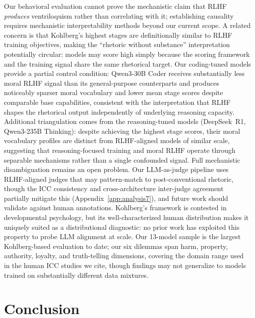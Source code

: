 \documentclass{article}
\begin{document}
Our behavioral evaluation cannot prove the mechanistic claim that RLHF \emph{produces} ventriloquism rather than correlating with it; establishing causality requires mechanistic interpretability methods beyond our current scope. A related concern is that Kohlberg's highest stages are definitionally similar to RLHF training objectives, making the ``rhetoric without substance'' interpretation potentially circular: models may score high simply because the scoring framework and the training signal share the same rhetorical target. Our coding-tuned models provide a partial control condition: Qwen3-30B Coder receives substantially less moral RLHF signal than its general-purpose counterparts and produces noticeably sparser moral vocabulary and lower mean stage scores despite comparable base capabilities, consistent with the interpretation that RLHF shapes the rhetorical output independently of underlying reasoning capacity. Additional triangulation comes from the reasoning-tuned models (DeepSeek~R1, Qwen3-235B Thinking): despite achieving the highest stage scores, their moral vocabulary profiles are distinct from RLHF-aligned models of similar scale, suggesting that reasoning-focused training and moral RLHF operate through separable mechanisms rather than a single confounded signal. Full mechanistic disambiguation remains an open problem. Our LLM-as-judge pipeline uses RLHF-aligned judges that may pattern-match to post-conventional rhetoric, though the ICC consistency and cross-architecture inter-judge agreement partially mitigate this (Appendix~\ref{app:analysis7}), and future work should validate against human annotations. Kohlberg's framework is contested in developmental psychology, but its well-characterized human distribution makes it uniquely suited as a distributional diagnostic: no prior work has exploited this property to probe LLM alignment at scale. Our 13-model sample is the largest Kohlberg-based evaluation to date; our six dilemmas span harm, property, authority, loyalty, and truth-telling dimensions, covering the domain range used in the human ICC studies we cite, though findings may not generalize to models trained on substantially different data mixtures.

\section{Conclusion}
\end{document}
